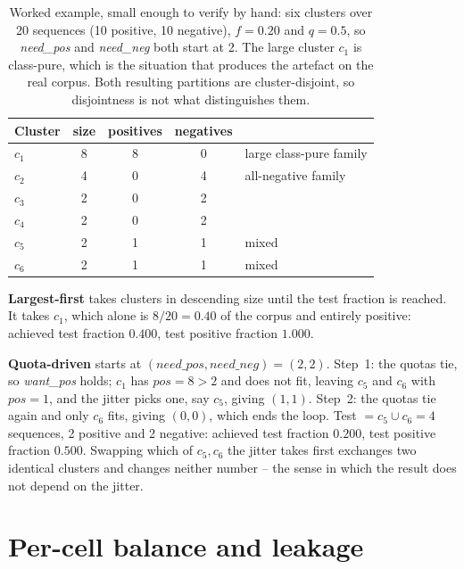 \documentclass[11pt,a4paper]{article}
\begin{document}
\begin{table}[htbp]\centering\small
\caption{Worked example, small enough to verify by hand: six clusters over 20 sequences
(10 positive, 10 negative), $f = 0.20$ and $q = 0.5$, so \textit{need\_pos} and
\textit{need\_neg} both start at 2. The large cluster $c_1$ is class-pure, which is the
situation that produces the artefact on the real corpus. Both resulting partitions are
cluster-disjoint, so disjointness is not what distinguishes them.}
\label{tab:worked}
\begin{tabular}{lcccl}
\toprule
Cluster & size & positives & negatives & \\
\midrule
$c_1$ & 8 & 8 & 0 & large class-pure family \\
$c_2$ & 4 & 0 & 4 & all-negative family \\
$c_3$ & 2 & 0 & 2 & \\
$c_4$ & 2 & 0 & 2 & \\
$c_5$ & 2 & 1 & 1 & mixed \\
$c_6$ & 2 & 1 & 1 & mixed \\
\bottomrule
\end{tabular}

\vspace{5pt}
\begin{minipage}{0.94\textwidth}\small
\textbf{Largest-first} takes clusters in descending size until the test fraction is
reached. It takes $c_1$, which alone is $8/20 = 0.40$ of the corpus and entirely positive:
achieved test fraction $\mathbf{0.400}$, test positive fraction $\mathbf{1.000}$.

\textbf{Quota-driven} starts at $(\textit{need\_pos}, \textit{need\_neg}) = (2, 2)$.
Step~1: the quotas tie, so \textit{want\_pos} holds; $c_1$ has $\textit{pos} = 8 > 2$ and
does not fit, leaving $c_5$ and $c_6$ with $\textit{pos} = 1$, and the jitter picks one, say
$c_5$, giving $(1, 1)$. Step~2: the quotas tie again and only $c_6$ fits, giving $(0, 0)$,
which ends the loop. Test $= c_5 \cup c_6 = 4$ sequences, 2 positive and 2 negative:
achieved test fraction $\mathbf{0.200}$, test positive fraction $\mathbf{0.500}$. Swapping
which of $c_5, c_6$ the jitter takes first exchanges two identical clusters and changes
neither number -- the sense in which the result does not depend on the jitter.
\end{minipage}
\end{table}

\section{Per-cell balance and leakage}
\end{document}
